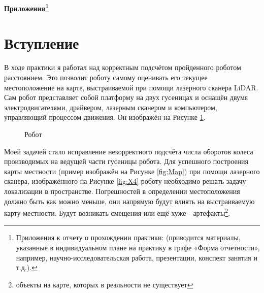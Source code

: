 \documentclass[12pt,a4paper]{scrartcl}
\begin{document}
		\newpage
	
	\begin{center}
		\textbf{Приложения\footnote{Приложения к отчету о прохождении практики: (приводится материалы, указанные в индивидуальном плане на практику в графе «Форма отчетности», например, научно-исследовательская работа, презентации, конспект занятия и т.д.).}}
	\end{center}
		
		\section*{Вступление}
			В ходе практики я работал над корректным подсчётом пройденного роботом расстоянием. Это позволит роботу самому оценивать его текущее местоположение на карте, выстраиваемой при помощи лазерного сканера LiDAR. Сам робот представляет собой платформу на двух гусеницах и оснащён двумя электродвигателями, драйвером, лазерным сканером и компьютером, управляющий процессом движения. Он изображён на Рисунке \ref{fig:Robot}.
			
			\begin{figure}[h]
				\caption{Робот}
				\label{fig:Robot}
			\end{figure}
			
			Моей задачей стало исправление некорректного подсчёта числа оборотов колеса производимых на ведущей части гусеницы робота. Для успешного построения карты местности (пример изображён на Рисунке \ref{fig:Map}) при помощи лазерного сканера, изображённого на Рисунке \ref{fig:X4} роботу необходимо решать задачу локализации в пространстве. Погрешностей в определении местоположения должно быть как можно меньше, они напрямую будут влиять на выстраиваемую карту местности. Будут возникать смещения или ещё хуже - артефакты\footnote{объекты на карте, которых в реальности не существует}.
			
\end{document}
